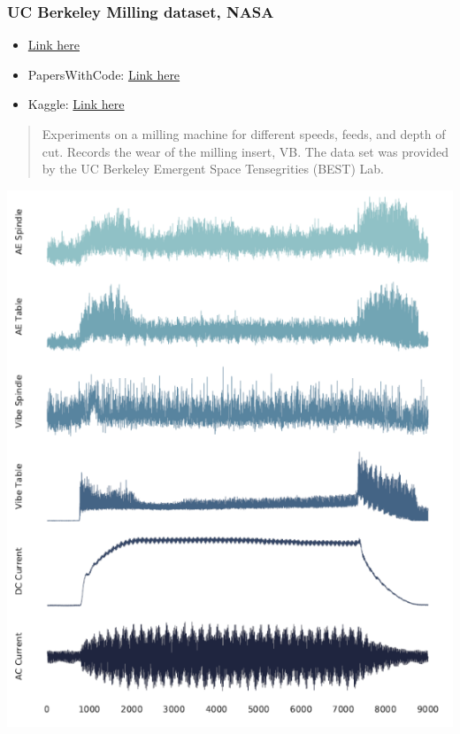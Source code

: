 \documentclass[
  letterpaper,
  DIV=11,
  numbers=noendperiod]{scrartcl}
\providecommand{\tightlist}{%
  \setlength{\itemsep}{0pt}\setlength{\parskip}{0pt}}\usepackage{longtable,booktabs,array}
\begin{document}
\hypertarget{uc-berkeley-milling-dataset-nasa}{%
\subsubsection{UC Berkeley Milling dataset,
NASA}\label{uc-berkeley-milling-dataset-nasa}}

\begin{itemize}
\tightlist
\item
  \href{https://www.nasa.gov/content/prognostics-center-of-excellence-data-set-repository}{Link
  here}
\item
  PapersWithCode:
  \href{https://paperswithcode.com/dataset/milling-data-set}{Link here}
\item
  Kaggle:
  \href{https://www.kaggle.com/datasets/vinayak123tyagi/milling-data-set-prognostic-data}{Link
  here}
\end{itemize}

\begin{quote}
Experiments on a milling machine for different speeds, feeds, and depth
of cut. Records the wear of the milling insert, VB. The data set was
provided by the UC Berkeley Emergent Space Tensegrities (BEST) Lab.
\end{quote}

\includegraphics{img/2023-01-12-11-28-23.png}
\end{document}
